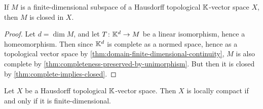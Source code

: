 \documentclass[article, a4paper, 11pt, oneside]{memoir}
\numberwithin{equation}{chapter}
\begin{document}
    


\begin{corollary}
    \label{thm:finite-dimensional-subspace-closed}
    If $M$ is a finite-dimensional subspace of a Hausdorff topological $\mathbb{K}$-vector space $X$, then $M$ is closed in $X$.
\end{corollary}

\begin{proof}
    Let $d = \dim M$, and let $T \colon \mathbb{K}^d \to M$ be a linear isomorphism, hence a homeomorphism. Then since $\mathbb{K}^d$ is complete as a normed space, hence as a topological vector space by \cref{thm:domain-finite-dimensional-continuity}, $M$ is also complete by \cref{thm:completeness-preserved-by-unimorphism}. But then it is closed by \cref{thm:complete-implies-closed}.
\end{proof}

\newcommand{\Span}{\operatorname{span}}

\begin{theorem}
    Let $X$ be a Hausdorff topological $\mathbb{K}$-vector space. Then $X$ is locally compact if and only if it is finite-dimensional.
\end{theorem}
\end{document}
